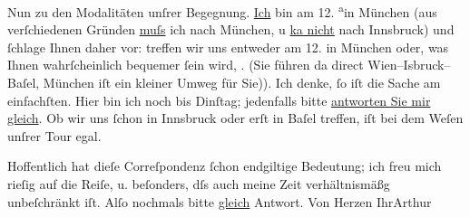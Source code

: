 \pstart
           Nun zu den Modalitäten unſrer Begegnung. \uline{Ich} bin am
                  12.{ }\substVorne{}\textsuperscript{a}\substDazwischen{}i\substHinten{}n München (aus verſchiedenen Gründen
                  \uline{muſs} ich nach München, u \uline{ka{\geminationn}
                  nicht} nach Innsbruck) und{ }ſchlage Ihnen
               daher vor: treffen wir uns entweder am 12.{ }{\pb}in München oder,
               was Ihnen wahrſcheinlich bequemer{ }ſein wird, . (Sie führen da{\geminationn} direct Wien–\introOben{}I{\geminationn}sbruck–\introOben{}Baſel, \label{T_L00830-1v}\label{T_L00830-1}München iſt ein kleiner Umweg für Sie)). Ich
               denke,{ }ſo iſt die Sache am einfachſten. Hier bin ich noch bis Dinſtag;
               jedenfalls bitte \uline{antworten Sie mir gleich}. Ob wir uns{ }ſchon in Innsbruck oder erſt {\pb}in Baſel treffen, iſt
               bei dem Weſen unſrer Tour egal.\pend
           
\pstart
           Hoffentlich hat dieſe Correſpondenz{ }ſchon endgiltige Bedeutung; ich freu mich rieſig
               auf die Reiſe, u. beſonders, dſs auch meine Zeit verhältnismäßg unbeſchränkt iſt.
               Alſo nochmals bitte \uline{gleich} Antwort. Von Herzen
                  Ihr\hspace*{1.5em}\spacefill\mbox{Arthur}\pend
           
